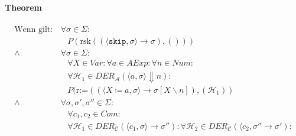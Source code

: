 				\paragraph{Theorem}
					\begin{align*}
						\text{Wenn gilt:} & \,\forall \sigma \in \Sigma :                                                                                                                                                                                              \\
						                  & \quad P(\text{rsk}((\langle \texttt{skip}, \sigma \rangle \rightarrow \sigma), ()))                                                                                                                                        \\
						\land             & \,\forall \sigma \in \Sigma :                                                                                                                                                                                              \\
						                  & \quad \forall X \in \textit{Var} : \forall a \in \textit{AExp} : \forall n \in \textit{Num} :                                                                                                                              \\
						                  & \quad \forall \mathcal{H} _ 1 \in \textit{DER} _ \mathcal{A} (\langle a, \sigma \rangle \Downarrow n) :                                                                                                                    \\
						                  & \quad P(\text{r:=}((\langle X \coloneqq a, \sigma \rangle \rightarrow \sigma[X \backslash n]), (\mathcal{H} _ 1))                                                                                                          \\
						\land             & \,\forall \sigma, \sigma', \sigma'' \in \Sigma :                                                                                                                                                                           \\
						                  & \quad \forall c _ 1, c _ 2 \in \textit{Com} :                                                                                                                                                                              \\
						                  & \quad \forall \mathcal{H} _ 1 \in \textit{DER} _ \mathcal{C} (\langle c _ 1, \sigma \rangle \rightarrow \sigma'') : \forall \mathcal{H} _ 2 \in \textit{DER} _ \mathcal{C} (\langle c _ 2, \sigma'' \rightarrow \sigma') : \\

\end{align*}
